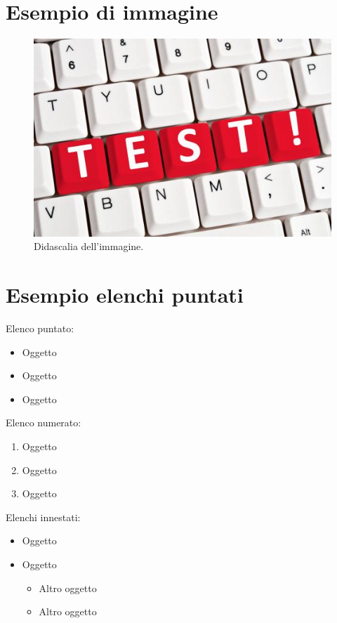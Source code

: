 \section{Esempio di immagine}
\begin{figure}[h]
\begin{center}
\includegraphics[scale=0.7]{img/test.jpg}
\caption{Didascalia dell'immagine.}
\end{center}
\end{figure}

\section{Esempio elenchi puntati}
Elenco puntato:
\begin{itemize}
	\item Oggetto
	\item Oggetto
	\item Oggetto
\end{itemize}

Elenco numerato:
\begin{enumerate}
	\item Oggetto
	\item Oggetto
	\item Oggetto
\end{enumerate}

Elenchi innestati:
\begin{itemize}
	\item Oggetto
	\item Oggetto
	\begin{itemize}
		\item Altro oggetto
		\item Altro oggetto
	\end{itemize}
\end{itemize}